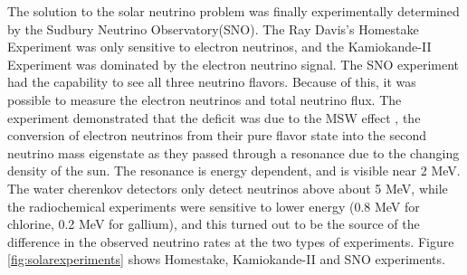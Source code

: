 The solution to the solar neutrino problem was finally experimentally determined by the Sudbury Neutrino Observatory(SNO). The Ray Davis's Homestake Experiment was only sensitive to electron neutrinos, and the Kamiokande-II Experiment was dominated by the electron neutrino signal. The SNO experiment had the capability to see all three neutrino flavors. Because of this, it was possible to measure the electron neutrinos and total neutrino flux. The experiment demonstrated that the deficit was due to the MSW effect \cite{Smirnov:2003da}, the conversion of electron neutrinos from their pure flavor state into the second neutrino mass eigenstate as they passed through a resonance due to the changing density of the sun. The resonance is energy dependent, and is visible near 2 MeV. The water cherenkov detectors only detect neutrinos above about 5 MeV, while the radiochemical experiments were sensitive to lower energy (0.8 MeV for chlorine, 0.2 MeV for gallium), and this turned out to be the source of the difference in the observed neutrino rates at the two types of experiments. Figure \ref{fig:solarexperiments} shows Homestake, Kamiokande-II and SNO experiments. 
